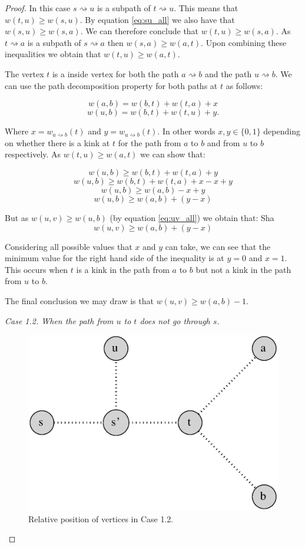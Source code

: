\begin{proof}
In this case $s \rightsquigarrow u$ is a subpath of $t \rightsquigarrow u$. This means that $w(t, u) \ge w(s, u)$. By equation \ref{eq:su_all} we also have that $w(s, u) \ge w(s, a)$. We can therefore conclude that $w(t, u) \ge w(s, a)$. As $t \rightsquigarrow a$ is a subpath of $s \rightsquigarrow a$ then $w(s, a) \ge w(a, t)$. Upon combining these inequalities we obtain that $w(t, u) \ge w(a, t)$.


The vertex $t$ is a inside vertex for both the path $a \rightsquigarrow b$ and the path $u \rightsquigarrow b$. We can use the path decomposition property for both paths at $t$ as follows:

$$ w(a, b) = w(b, t) + w(t, a) + x  $$
$$ w(u, b) = w(b, t) + w(t, u) + y .$$


Where $x = w_{a \rightsquigarrow b}(t)$ and $y = w_{u \rightsquigarrow b}(t)$. In other words $x, y \in \{0, 1\}$ depending on whether there is a kink at $t$ for the path from $a$ to $b$ and from $u$ to $b$ respectively. As $w(t, u) \ge w(a, t)$ we can show that:


$$ w(u, b) \ge w(b, t) + w(t, a) + y $$
$$ w(u, b) \ge w(b, t) + w(t, a) + x - x + y $$
$$ w(u, b) \ge w(a, b) - x + y $$
$$ w(u, b) \ge w(a, b) + (y - x) $$

But as $w(u, v) \ge w(u, b)$ (by equation \ref{eq:uv_all}) we obtain that: Sha
$$ w(u, v) \ge w(a, b) + (y - x) $$

Considering all possible values that $x$ and $y$ can take, we can see that the minimum value for the right hand side of the inequality is at $y = 0$ and $x = 1$. This occurs when $t$ is a kink in the path from $a$ to $b$ but not a kink in the path from $u$ to $b$.

The final conclusion we may draw is that $w(u, v) \ge w(a, b) -1$.

{\em Case 1.2. When the path from $u$ to $t$ does not go through $s$.}

\begin{figure}[h]%
    \centering
    \includegraphics[center, scale=0.4 ]{./images/2xbfs-case-1-2.eps}
    \caption{Relative position of vertices in Case 1.2. }%
    \label{fig:case1.2}%
\end{figure}


\end{proof}

